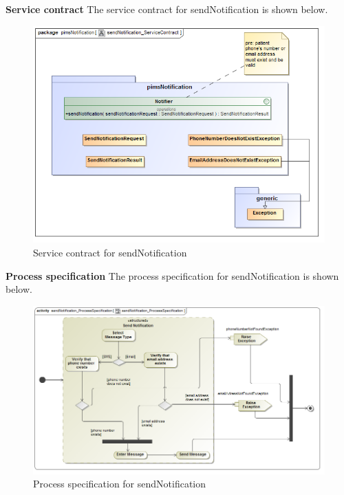 \begin{description}
		\begin{description}
		\item{\textbf{Service contract}} The service contract for sendNotification is shown below.
		\begin{figure}[H]
		\centerline{\includegraphics[width= 0.7\linewidth]{./Functional_Requirements/Graphics/pimsNotification/sendNotification_ServiceContract}}
			\caption{Service contract for sendNotification }
		\end{figure}
	\end{description}
	\begin{description}
		\item{\textbf{Process specification}} The process specification for sendNotification is shown below.
		\begin{figure}[H]
		\centerline{\includegraphics[width= 0.7\linewidth]{./Functional_Requirements/Graphics/pimsNotification/sendNotification_ProcessSpecification}}
			\caption{Process specification for sendNotification }
		\end{figure}
	\end{description}		
	
\end{description}
